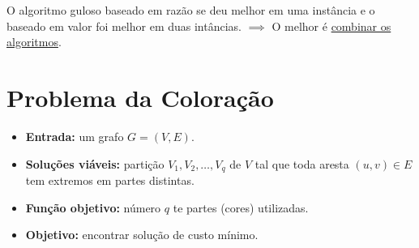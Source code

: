 \begin{algorithm}
    \SetAlgoLined

\end{algorithm}

O algoritmo guloso baseado em razão se deu melhor em uma instância e o baseado em valor foi melhor em duas intâncias. $\implies$ O melhor é \underline{combinar os algoritmos}.

\section{Problema da Coloração}

\begin{itemize}
    \item \textbf{Entrada:} um grafo $G = (V, E)$.
    \item \textbf{Soluções viáveis:} partição $V_1, V_2, \dots , V_q$ de $V$ tal que toda aresta $(u, v) \in E$ tem extremos em partes distintas.
    \item \textbf{Função objetivo:} número $q$ te partes (cores) utilizadas.
    \item \textbf{Objetivo:} encontrar solução de custo mínimo.
\end{itemize}

\begin{algorithm}
    \SetAlgoLined

\end{algorithm}

